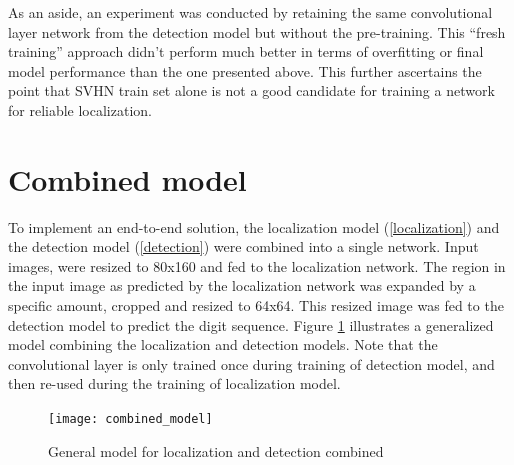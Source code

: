 \documentclass{article}
\begin{document}
	As an aside, an experiment was conducted by retaining the same convolutional layer network from the detection model but without the pre-training. This ``fresh training'' approach didn't perform much better in terms of overfitting or final model performance than the one presented above. This further ascertains the point that SVHN train set alone is not a good candidate for training a network for reliable localization.
	
	\section{Combined model}\label{combined_model}
	To implement an end-to-end solution, the localization model (\ref{localization}) and the detection model (\ref{detection}) were combined into a single network. Input images, were resized to 80x160 and fed to the localization network. The region in the input image as predicted by the localization network was expanded by a specific amount, cropped and resized to 64x64. This resized image was fed to the detection model to predict the digit sequence. Figure \ref{fig:combined_model} illustrates a generalized model combining the localization and detection models. Note that the convolutional layer is only trained once during training of detection model, and then re-used during the training of localization model.
	
	\begin{figure}[h]
		\centering
		\texttt{[image: combined\_model]}
		\caption{General model for localization and detection combined}
		\label{fig:combined_model}
	\end{figure}
	
\end{document}
